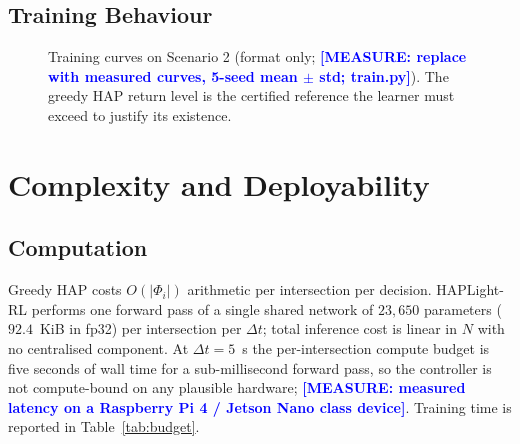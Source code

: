 \documentclass[journal]{IEEEtran}
\newcommand{\note}[1]{\textcolor{blue}{\textbf{[MEASURE: #1]}}}
\begin{document}
\subsection{Training Behaviour}
\begin{figure}[htbp]
\centering
{}
\caption{Training curves on Scenario 2 (format only;
\note{replace with measured curves, 5-seed mean $\pm$ std; train.py}).
The greedy HAP return level is the certified reference the learner must
exceed to justify its existence.}
\label{fig:training}
\end{figure}

\section{Complexity and Deployability}
\label{sec:complexity}

\subsection{Computation}
Greedy HAP costs $O(|\Phi_i|)$ arithmetic per intersection per decision.
HAPLight-RL performs one forward pass of a single shared network of
$23{,}650$ parameters ($92.4$~KiB in fp32) per intersection per
$\Delta t$; total inference cost is linear in $N$ with no centralised
component. At $\Delta t=5$~s the per-intersection compute budget is five
seconds of wall time for a sub-millisecond forward pass, so the
controller is not compute-bound on any plausible hardware;
\note{measured latency on a Raspberry Pi 4 / Jetson Nano class device}.
Training time is reported in Table~\ref{tab:budget}.
\end{document}
